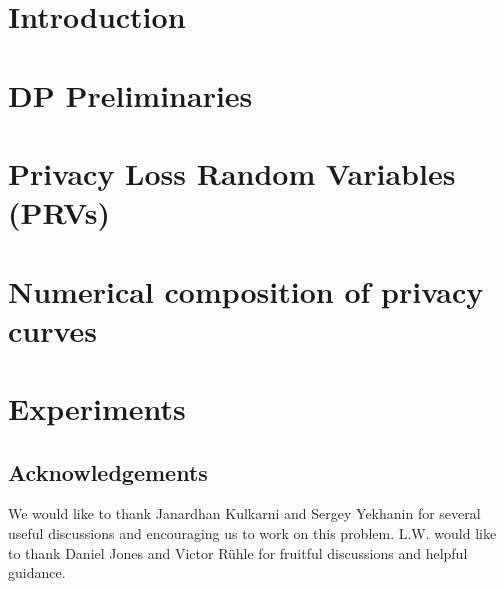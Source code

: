\documentclass{article}
\let\ynote\undefined
\newcommand{\ynote}[1]{}%
\begin{document}
\section{Introduction}
\label{sec:intro}


\section{DP Preliminaries}
\label{sec:prelims}


\section{Privacy Loss Random Variables (PRVs)}
\label{sec:PRV}



\section{Numerical composition of privacy curves}
\label{sec:numerical_composition}


\section{Experiments}
\label{sec:experiments}



\subsection*{Acknowledgements}
We would like to thank Janardhan Kulkarni and Sergey Yekhanin for several useful discussions and encouraging us to work on this problem.
L.W. would like to thank Daniel Jones and Victor R\"uhle for fruitful discussions and helpful guidance.

\FloatBarrier






\appendix



\end{document}

